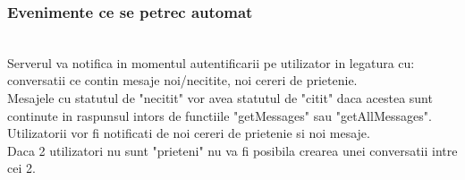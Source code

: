 \documentclass[runningheads]{llncs}
\begin{document}
\subsubsection{Evenimente ce se petrec automat }\hfill\\
Serverul va notifica in momentul autentificarii pe utilizator in legatura cu: conversatii ce contin mesaje noi/necitite, noi cereri de prietenie.\\
Mesajele cu statutul de "necitit" vor avea statutul de "citit" daca acestea sunt continute in raspunsul intors de functiile "getMessages" sau "getAllMessages".\\
Utilizatorii vor fi notificati de noi cereri de prietenie si noi mesaje.\\
Daca 2 utilizatori nu sunt "prieteni" nu va fi posibila crearea unei conversatii intre cei 2.\\
\end{document}
